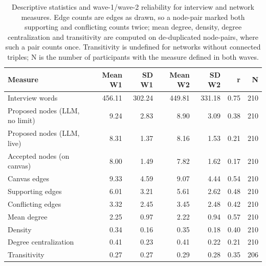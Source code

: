 \begin{table}
\caption{Descriptive statistics and wave-1/wave-2 reliability for interview and network measures. Edge counts are edges as drawn, so a node-pair marked both supporting and conflicting counts twice; mean degree, density, degree centralization and transitivity are computed on de-duplicated node-pairs, where such a pair counts once. Transitivity is undefined for networks without connected triples; N is the number of participants with the measure defined in both waves.}
\label{tab:reliability_descriptives}
\begin{tabular}{lrrrrrr}
\toprule
Measure & Mean W1 & SD W1 & Mean W2 & SD W2 & r & N \\
\midrule
Interview words & 456.11 & 302.24 & 449.81 & 331.18 & 0.75 & 210 \\
Proposed nodes (LLM, no limit) & 9.24 & 2.83 & 8.90 & 3.09 & 0.38 & 210 \\
Proposed nodes (LLM, live) & 8.31 & 1.37 & 8.16 & 1.53 & 0.21 & 210 \\
Accepted nodes (on canvas) & 8.00 & 1.49 & 7.82 & 1.62 & 0.17 & 210 \\
Canvas edges & 9.33 & 4.59 & 9.07 & 4.44 & 0.54 & 210 \\
Supporting edges & 6.01 & 3.21 & 5.61 & 2.62 & 0.48 & 210 \\
Conflicting edges & 3.32 & 2.45 & 3.45 & 2.48 & 0.42 & 210 \\
Mean degree & 2.25 & 0.97 & 2.22 & 0.94 & 0.57 & 210 \\
Density & 0.34 & 0.16 & 0.35 & 0.18 & 0.40 & 210 \\
Degree centralization & 0.41 & 0.23 & 0.41 & 0.22 & 0.21 & 210 \\
Transitivity & 0.27 & 0.27 & 0.29 & 0.28 & 0.35 & 206 \\
\bottomrule
\end{tabular}
\end{table}
